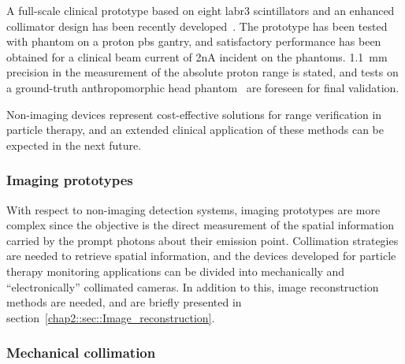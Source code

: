 A full-scale clinical prototype based on eight \gls{labr3} scintillators and an enhanced collimator design has been recently developed~\parencite{HuesoGonzalez2018}. The prototype has been tested with phantom on a proton \gls{pbs} gantry, and satisfactory performance has been obtained for a clinical beam current of 2nA incident on the phantoms. 1.1~mm precision in the measurement of the absolute proton range is stated, and tests on a ground-truth anthropomorphic head phantom~\parencite{Wohlfahrt2018} are foreseen for final validation.   

Non-imaging devices represent cost-effective solutions for range verification in particle therapy, and an extended clinical application of these methods can be expected in the next future. 

\subsubsection{Imaging prototypes}\label{chap2::subsec::PGdevices_Imaging}

With respect to non-imaging detection systems, imaging prototypes are more complex since the objective is the direct measurement of the spatial information carried by the prompt photons about their emission point. Collimation strategies are needed to retrieve spatial information, and the devices developed for particle therapy monitoring applications can be divided into mechanically and \enquote{electronically} collimated cameras. In addition to this, image reconstruction methods are needed, and are briefly presented in section~\ref{chap2::sec::Image_reconstruction}. 

\subsubsection{Mechanical collimation}\label{chap2::subsubsec::PGI_mechColl}

